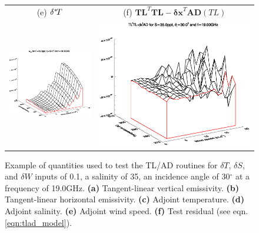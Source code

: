 \begin{figure}[htp]
\begin{tabular}{c c}
    \textsf{(e)} $\delta^{*}\! T$ &
    \textsf{(f)} $\mathbf{TL}^{T}\mathbf{TL} - \mathbf{\delta x}^{T}\mathbf{AD}(TL)$ \\
    \includegraphics[bb=110 240 508 540,clip,scale=0.5]{graphics/Model/TLAD/w_AD_s35.0ppt_z30.0_19.00GHz.eps} & 
    \includegraphics[bb=110 240 508 540,clip,scale=0.5]{graphics/Model/TLAD/TLtTL-dxtAD_s35.0ppt_z30.0_19.00GHz.eps}
  \end{tabular}
  \caption{Example of quantities used to test the TL/AD routines for $\delta{T}$, $\delta{S}$, and $\delta{W}$ inputs of 0.1, a salinity of 35\textperthousand, an incidence angle of 30$^{\circ}$ at a frequency of 19.0GHz. \textbf{(a)} Tangent-linear vertical emissivity. \textbf{(b)} Tangent-linear horizontal emissivity. \textbf{(c)} Adjoint temperature.  \textbf{(d)} Adjoint salinity. \textbf{(e)} Adjoint wind speed. \textbf{(f)} Test residual (see eqn.\ref{eqn:tlad_model}).}
  \label{fig:tlad_s35.0ppt_z30.0_19.00GHz}
\end{figure}
